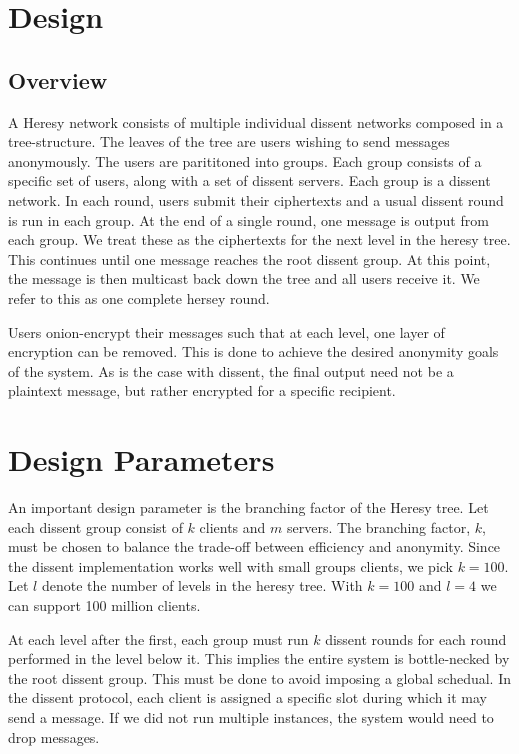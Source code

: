 \section{Design}
\subsection{Overview}
A Heresy network consists of multiple individual dissent networks composed in a tree-structure. The leaves of the tree are users wishing to send messages anonymously. The users are parititoned into groups. Each group consists of a specific set of users, along with a set of dissent servers. Each group is a dissent network. In each round, users submit their ciphertexts and a usual dissent round is run in each group. At the end of a single round, one message is output from each group. We treat these as the ciphertexts for the next level in the heresy tree. This continues until one message reaches the root dissent group. At this point, the message is then multicast back down the tree and all users receive it. We refer to this as one complete hersey round.

Users onion-encrypt their messages such that at each level, one layer of encryption can be removed. This is done to achieve the desired anonymity goals of the system. As is the case with dissent, the final output need not be a plaintext message, but rather encrypted for a specific recipient.

\section{Design Parameters}

An important design parameter is the branching factor of the Heresy tree. Let each dissent group consist of $k$ clients and $m$ servers. The branching factor, $k$, must be chosen to balance the trade-off between efficiency and anonymity. Since the dissent implementation works well with small groups clients, we pick $k=100$. Let $l$ denote the number of levels in the heresy tree. With $k=100$ and $l=4$ we can support 100 million clients.

At each level after the first, each group must run $k$ dissent rounds for each round performed in the level below it. This implies the entire system is bottle-necked by the root dissent group. This must be done to avoid imposing a global schedual. In the dissent protocol, each client is assigned a specific slot during which it may send a message. If we did not run multiple instances, the system would need to drop messages. 

